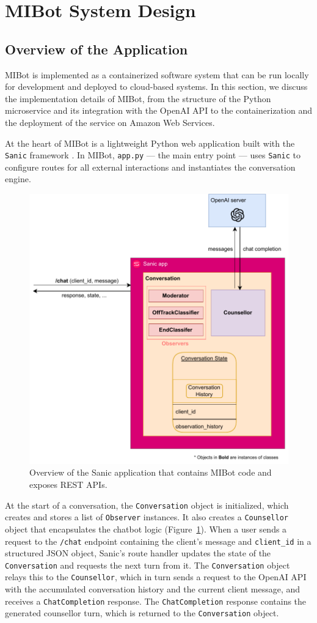 \section{MIBot System Design}
\label{sec:deployment}


\subsection{Overview of the Application}


MIBot is implemented as a containerized software system that can be run locally for development and deployed to cloud-based systems. In this section, we discuss the implementation details of MIBot, from the structure of the Python microservice and its integration with the OpenAI API to the containerization and the deployment of the service on Amazon Web Services.

At the heart of MIBot is a lightweight Python web application built with the \texttt{Sanic} framework \cite{pi_sanic}. In MIBot, \texttt{app.py} --- the main entry point --- uses \texttt{Sanic} to configure routes for all external interactions and instantiates the conversation engine.
\begin{figure}[ht]
  \centering
  \includegraphics[width=0.7\linewidth]{fig/microservice.drawio.pdf} 
  \caption{Overview of the Sanic application that contains MIBot code and exposes REST APIs.}
  \label{fig:microservice}
\end{figure}
At the start of a conversation, the \texttt{Conversation} object is initialized, which creates and stores a list of \texttt{Observer} instances. It also creates a \texttt{Counsellor} object that encapsulates the chatbot logic (Figure~\ref{fig:microservice}). When a user sends a request to the \texttt{/chat} endpoint containing the client's message and \texttt{client\_id} in a structured JSON object, Sanic's route handler updates the state of the \texttt{Conversation} and requests the next turn from it. The \texttt{Conversation} object relays this to the \texttt{Counsellor}, which in turn sends a request to the OpenAI API with the accumulated conversation history and the current client message, and receives a \texttt{ChatCompletion} response. The \texttt{ChatCompletion} response contains the generated counsellor turn, which is returned to the \texttt{Conversation} object.

